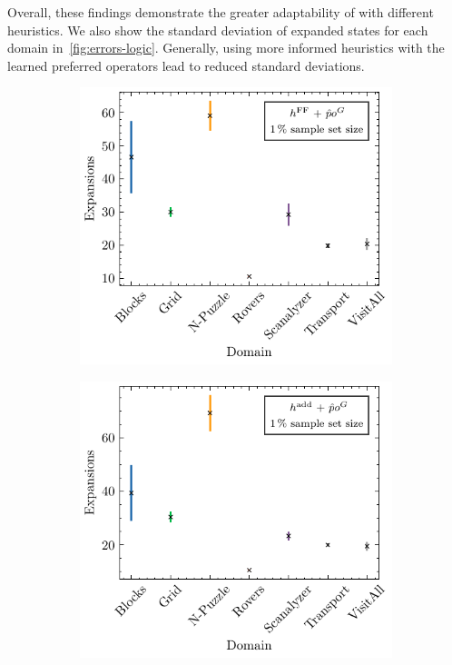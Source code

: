 \documentclass[ppgc,diss,english]{iiufrgs}
\begin{document}
Overall, these findings demonstrate the greater adaptability of \pog with different heuristics. We also show the standard deviation of expanded states for each domain in~\cref{fig:errors-logic}. Generally, using more informed heuristics with the learned preferred operators lead to reduced standard deviations.

\begin{figure}[tb]
  \caption[Standard deviation of expansions using logic heuristics with \pog]{Mean number of expansions and its standard deviation per domain for GBFS guided by different logic-based heuristics and \pog trained on a $1\,\%$ sample set size.}
  \centering
  \vspace{\baselineskip}
  \begin{subfigure}{0.41\textwidth}
    \centering
    \includegraphics[width=\linewidth]{img/error_hFF_poG_1pct.pdf}
  \end{subfigure}
  \begin{subfigure}{0.41\textwidth}
    \centering
    \includegraphics[width=\linewidth]{img/error_hADD_poG_1pct.pdf}
  \end{subfigure}


\end{figure}
\end{document}
